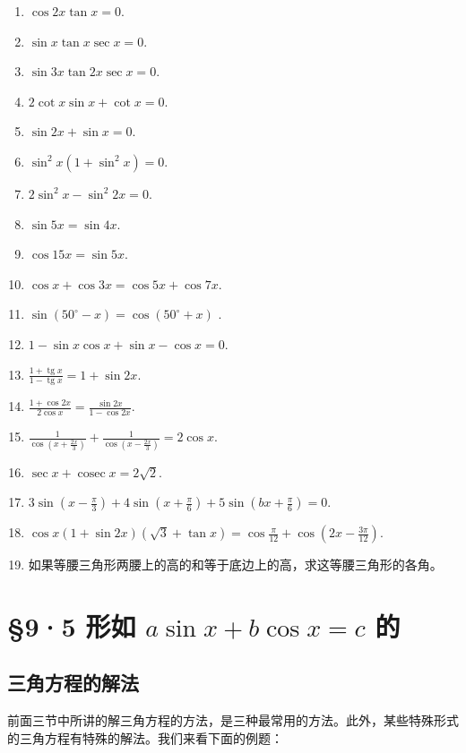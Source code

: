 \begin{enumerate}[start=2]
\item
  \(\cos 2x \tan x = 0.\)
\item
  \(\sin x \tan x \sec x = 0\).
\item
  \(\sin 3x \tan 2x \sec x = 0.\)
\item
  \(2\cot x\sin x + \cot x = 0.\)
\item
  \(\sin 2x + \sin x = 0.\)
\item
  \(\sin^2 x(1 + \sin^2 x) = 0.\)
\item
  \(2\sin^{2}x - \sin^{2}2x = 0.\)
\item
  \(\sin5x=\sin4x.\)
\item
  \(\cos15x=\sin5x.\)
\item
  \(\cos x + \cos 3x = \cos 5x + \cos 7x.\)
\item
  \(\sin(50^{\circ}-x)=\cos(50^{\circ}+x)\) .
\item
  \(1 - \sin x \cos x + \sin x - \cos x = 0.\)
\item
  \(\frac{1 + \operatorname{tg} x}{1 - \operatorname{tg} x} = 1 + \sin 2x.\)
\item
  \(\frac{1 + \cos 2x}{2\cos x} = \frac{\sin 2x}{1 - \cos 2x}\).
\item
  \(\frac{1}{\cos\left(x + \frac{2x}{3}\right)} + \frac{1}{\cos\left(x - \frac{2x}{3}\right)} = 2\cos x.\)
\item
  \(\sec x + \operatorname{cosec} x = 2\sqrt{2}\).
\item
  \(3\sin\left(x-\frac{\pi}{3}\right)+4\sin\left(x+\frac{\pi}{6}\right)+5\sin\left(bx+\frac{\pi}{6}\right)=0.\)
\item
  \(\cos x(1 + \sin 2x)(\sqrt{3} + \tan x) = \cos \frac{\pi}{12} + \cos \left(2x - \frac{3\pi}{12}\right)\).
\item
  如果等腰三角形两腰上的高的和等于底边上的高，求这等腰三角形的各角。
\end{enumerate}

\section{\texorpdfstring{§9·5 形如 \(a \sin x + b \cos x = c\) 的}{§9·5 形如 a \textbackslash sin x + b \textbackslash cos x = c 的}}

\subsection{三角方程的解法}

前面三节中所讲的解三角方程的方法，是三种最常用的方法。此外，某些特殊形式的三角方程有特殊的解法。我们来看下面的例题：

